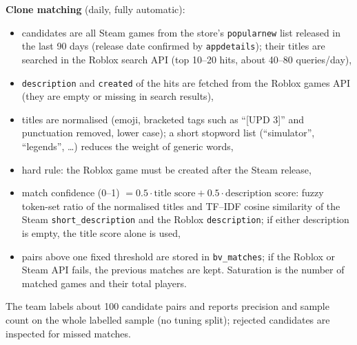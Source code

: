 \documentclass[10pt,a4paper]{article}
\newcommand{\ep}[1]{\texttt{\small #1}}
\begin{document}
\textbf{Clone matching} (daily, fully automatic):
\begin{itemize}
  \item candidates are all Steam games from the store's \ep{popularnew} list released in the last 90 days (release date confirmed by \ep{appdetails}); their titles are searched in the Roblox search API (top 10--20 hits, about 40--80 queries/day),
  \item \ep{description} and \ep{created} of the hits are fetched from the Roblox games API (they are empty or missing in search results),
  \item titles are normalised (emoji, bracketed tags such as ``[UPD 3]'' and punctuation removed, lower case); a short stopword list (``simulator'', ``legends'', \ldots) reduces the weight of generic words,
  \item hard rule: the Roblox game must be created after the Steam release,
  \item match confidence (0--1) $= 0.5\cdot\text{title score} + 0.5\cdot\text{description score}$: fuzzy token-set ratio of the normalised titles and TF--IDF cosine similarity of the Steam \ep{short\_description} and the Roblox \ep{description}; if either description is empty, the title score alone is used,
  \item pairs above one fixed threshold are stored in \ep{bv\_matches}; if the Roblox or Steam API fails, the previous matches are kept. Saturation is the number of matched games and their total players.
\end{itemize}
The team labels about 100 candidate pairs and reports precision and sample count on the whole labelled sample (no tuning split); rejected candidates are inspected for missed matches.
\end{document}
